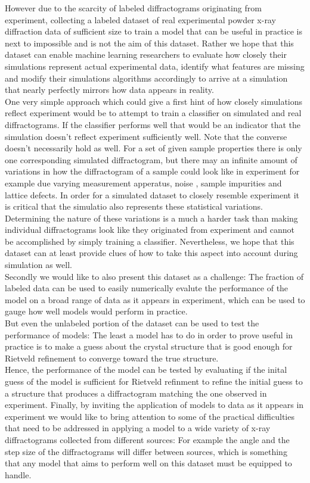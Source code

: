 However due to the scarcity of labeled diffractograms originating from experiment, collecting a labeled dataset
of real experimental powder x-ray diffraction data of sufficient size to train a model
that can be useful in practice is next to impossible and is not the aim of this dataset.
Rather we hope that this dataset can enable machine learning researchers to evaluate how closely their simulations
represent actual experimental data, identify what features are missing and modify their simulations algorithms
accordingly to arrive at a simulation that nearly perfectly mirrors how data appears in reality.\\
One very simple approach which could give a first hint of how closely simulations reflect experiment would be to attempt
to train a classifier on simulated and real diffractograms.
If the classifier performs well that would be an indicator that the simulation doesn't reflect experiment sufficiently well.
Note that the converse doesn't necessarily hold as well.
For a set of given sample properties there is only one corresponding simulated diffractogram, but there may an infinite amount of
variations in how the diffractogram of a sample could look like in experiment for example due varying measurement apperatus, noise
, sample impurities and lattice defects.
In order for a simulated dataset to closely resemble experiment it is critical that the simulatio also represents these
statistical variations.
Determining the nature of these variations is a much a harder task than making individual diffractograms look like they
originated from experiment and cannot be accomplished by simply training a classifier.
Nevertheless, we hope that this dataset can at least provide clues of how to take this aspect into account during
simulation as well.\\

Secondly we would like to also present this dataset as a challenge: The fraction of labeled data can be used to
easily numerically evalute the performance of the model on a broad range of data as it appears in experiment, which can be used
to gauge how well models would perform in practice. \\
But even the unlabeled portion of the dataset can be used to test the performance of models: The least a model
has to do in order to prove useful in practice is to make a guess about the crystal structure that is good enough
for Rietveld refinement to converge toward the true structure. \\
Hence, the performance of the model can be tested by evaluating if the inital guess of the model is sufficient for
Rietveld refinment to refine the initial guess to a structure that produces a diffractogram matching the one observed in experiment.
Finally, by inviting the application of models to data as it appears in experiment we would like to bring attention
to some of the practical difficulties that need to be addressed in applying a model to a wide variety of x-ray diffractograms
collected from different sources: For example the angle and the step size of the diffractograms will differ between sources, 
which is something that any model that aims to perform well on this dataset must be equipped to handle.


